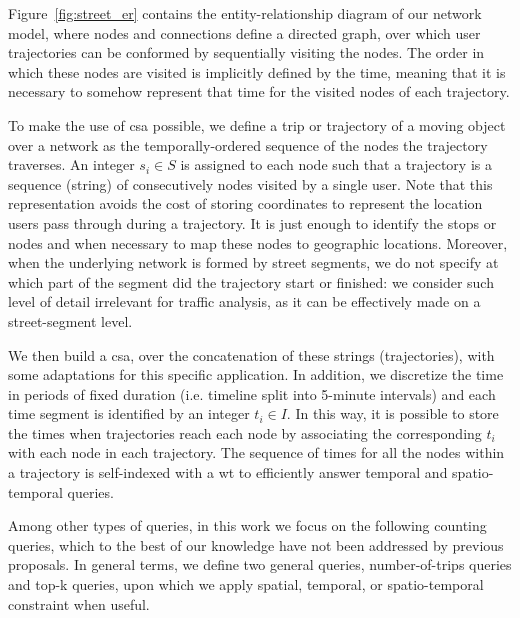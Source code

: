     Figure~\ref{fig:street_er} contains the entity-relationship diagram of our network model, where nodes and connections define a directed graph, over which user trajectories can be conformed by sequentially visiting the nodes. The order in which these nodes are visited is implicitly defined by the time, meaning that it is necessary to somehow represent that time for the visited nodes of each trajectory.
	
	To make the
	use of \gls{csa} possible, we define a trip or trajectory of a moving object
	over a network as the temporally-ordered sequence of the nodes the trajectory
	traverses. An integer $s_i \in S$ is assigned to each node such that a trajectory is a sequence (string) of consecutively nodes visited by a single user. Note that this representation avoids the cost of storing coordinates to represent the location users pass through during a trajectory. It is just enough to identify the stops or nodes and when necessary to map these nodes to geographic locations. Moreover, when the underlying network is formed by street segments, we do not specify at which part of the segment did the trajectory start or finished: we consider such level of detail irrelevant for traffic analysis, as it can be effectively made on a street-segment level.
	
	We then build a \gls{csa}, over the concatenation of
	these strings (trajectories), with some adaptations for this
	specific application. In addition, we discretize the time in periods of fixed
	duration (i.e. timeline split into 5-minute intervals) and each time
	segment is identified by an integer $t_i \in I$. In this way, it is possible
	to store the times when trajectories reach each node by associating the
	corresponding $t_i$ with each node in each trajectory. The sequence of
	times for all the nodes within a trajectory is self-indexed with a \gls{wt}
	to efficiently answer temporal and spatio-temporal queries.

	Among other types of queries, in this work we focus on the following counting queries, which to the best of our knowledge have not been  addressed by previous proposals. In general terms, we define two general queries, number-of-trips queries and top-k queries, upon which we apply spatial, temporal, or spatio-temporal constraint when useful.

